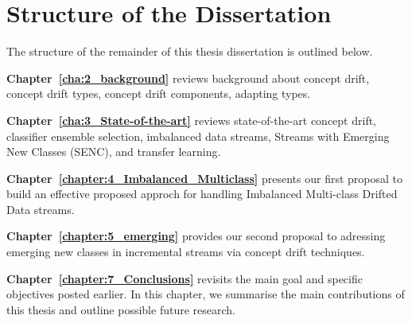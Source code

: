 
\section{Structure of the Dissertation}
\label{sec:1_introduction_organizations}
The structure of the remainder of this thesis dissertation is outlined below.
\begin{description}	
	\item \textbf{Chapter~\ref{cha:2_background}} reviews background about concept drift, concept drift types, concept drift components, adapting types.  
	
	\item \textbf{Chapter~\ref{cha:3_State-of-the-art}} reviews state-of-the-art  concept drift, classifier ensemble selection, imbalanced data streams, Streams with Emerging New Classes (SENC), and transfer learning.  
	
	\item \textbf{Chapter~\ref{chapter:4_Imbalanced_Multiclass}
	} presents our first proposal to build an effective proposed approch for  handling Imbalanced Multi-class Drifted Data streams.
	
	\item \textbf{Chapter~\ref{chapter:5_emerging}} provides our second proposal to adressing emerging new classes in incremental streams via concept drift techniques. 
	
	
	\item \textbf{Chapter~\ref{chapter:7_Conclusions}} revisits the main goal and specific objectives posted earlier. In this chapter, we summarise the main contributions of this thesis and outline possible future research.


\end{description}